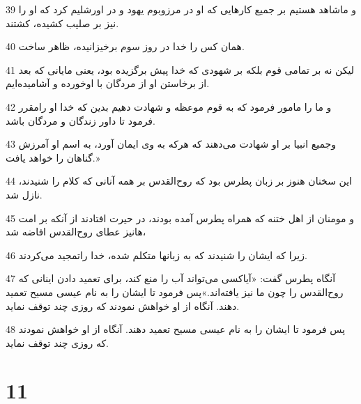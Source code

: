 \par 39 و ماشاهد هستیم بر جمیع کارهایی که او در مرزوبوم یهود و در اورشلیم کرد که او را نیز بر صلیب کشیده، کشتند.
\par 40 همان کس را خدا در روز سوم برخیزانیده، ظاهر ساخت.
\par 41 لیکن نه بر تمامی قوم بلکه بر شهودی که خدا پیش برگزیده بود، یعنی مایانی که بعد از برخاستن او از مردگان با اوخورده و آشامیده‌ایم.
\par 42 و ما را مامور فرمود که به قوم موعظه و شهادت دهیم بدین که خدا او رامقرر فرمود تا داور زندگان و مردگان باشد.
\par 43 وجمیع انبیا بر او شهادت می‌دهند که هر‌که به وی ایمان آورد، به اسم او آمرزش گناهان را خواهد یافت.»
\par 44 این سخنان هنوز بر زبان پطرس بود که روح‌القدس بر همه آنانی که کلام را شنیدند، نازل شد.
\par 45 و مومنان از اهل ختنه که همراه پطرس آمده بودند، در حیرت افتادند از آنکه بر امت هانیز عطای روح‌القدس افاضه شد،
\par 46 زیرا که ایشان را شنیدند که به زبانها متکلم شده، خدا راتمجید می‌کردند.
\par 47 آنگاه پطرس گفت: «آیاکسی می‌تواند آب را منع کند، برای تعمید دادن اینانی که روح‌القدس را چون ما نیز یافته‌اند.»پس فرمود تا ایشان را به نام عیسی مسیح تعمید دهند. آنگاه از او خواهش نمودند که روزی چند توقف نماید.
\par 48 پس فرمود تا ایشان را به نام عیسی مسیح تعمید دهند. آنگاه از او خواهش نمودند که روزی چند توقف نماید.

\chapter{11}


